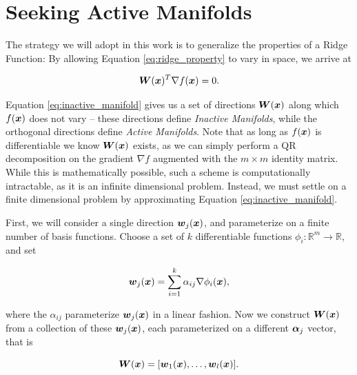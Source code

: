 \documentclass[]{aiaa-tc}%
\begin{document}
\section{Seeking Active Manifolds} \label{sec:active_manifolds}
The strategy we will adopt in this work is to generalize the properties of a Ridge Function: By allowing Equation \ref{eq:ridge_property} to vary in space, we arrive at

\begin{equation}
  \label{eq:inactive_manifold}
  \boldsymbol{W}(\boldsymbol{x})^T \nabla f(\boldsymbol{x}) = 0.
\end{equation}%
%
%
%
%

Equation \ref{eq:inactive_manifold} gives us a set of directions $\boldsymbol{W}(\boldsymbol{x})$ along which $f(\boldsymbol{x})$ does not vary -- these directions define \emph{Inactive Manifolds}, while the orthogonal directions define \emph{Active Manifolds}. Note that as long as $f(\boldsymbol{x})$ is differentiable we know $\boldsymbol{W}(\boldsymbol{x})$ exists, as we can simply perform a QR decomposition on the gradient $\nabla f$ augmented with the $m\times m$ identity matrix. While this is mathematically possible, such a scheme is computationally intractable, as it is an infinite dimensional problem. Instead, we must settle on a finite dimensional problem by approximating Equation \ref{eq:inactive_manifold}.

First, we will consider a single direction $\boldsymbol{w}_j(\boldsymbol{x})$, and parameterize on a finite number of basis functions. Choose a set of $k$ differentiable functions $\phi_i:\mathbb{R}^m\to\mathbb{R}$, and set

\begin{equation}
\label{eq:parameterized_w}
\boldsymbol{w}_j(\boldsymbol{x}) = \sum_{i=1}^k \alpha_{ij}\nabla\phi_i(\boldsymbol{x}),
\end{equation}
%
%
%
%

where the $\alpha_{ij}$ parameterize $\boldsymbol{w}_j(\boldsymbol{x})$ in a linear fashion. Now we construct $\boldsymbol{W}(\boldsymbol{x})$ from a collection of these $\boldsymbol{w}_j(\boldsymbol{x})$, each parameterized on a different $\boldsymbol{\alpha}_j$ vector, that is

\begin{equation}
\boldsymbol{W}(\boldsymbol{x}) = [\boldsymbol{w}_1(\boldsymbol{x}),\dots,\boldsymbol{w}_l(\boldsymbol{x})].
\end{equation}
\end{document}
